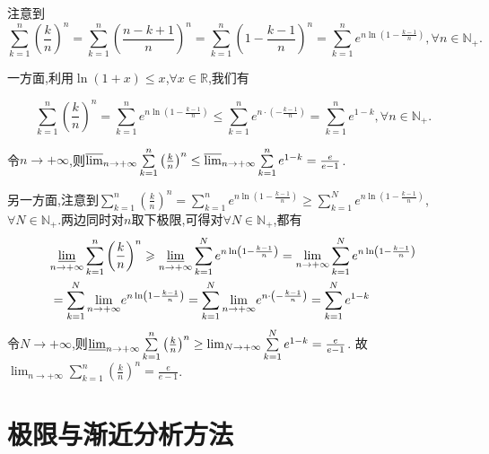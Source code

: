\documentclass[lang=cn,newtx,10pt,scheme=chinese]{elegantbook}
\begin{document}
\begin{solution}
   注意到
\[
\sum\limits_{k = 1}^{n}\left(\frac{k}{n}\right)^n = \sum\limits_{k = 1}^{n}\left(\frac{n - k + 1}{n}\right)^n = \sum\limits_{k = 1}^{n}\left(1 - \frac{k - 1}{n}\right)^n = \sum\limits_{k = 1}^{n}e^{n\ln\left(1 - \frac{k - 1}{n}\right)},  \forall n \in \mathbb{N}_+.
\]

一方面,利用\(\ln(1 + x) \leq x\),\(\forall x \in \mathbb{R}\),我们有

\[
\sum\limits_{k = 1}^{n}\left(\frac{k}{n}\right)^n = \sum\limits_{k = 1}^{n}e^{n\ln\left(1 - \frac{k - 1}{n}\right)} \leq \sum\limits_{k = 1}^{n}e^{n\cdot\left(-\frac{k - 1}{n}\right)} = \sum\limits_{k = 1}^{n}e^{1 - k},  \forall n \in \mathbb{N}_+.
\]

令\(n \to +\infty\),则\(\varlimsup_{n \to +\infty}\sum\limits_{k = 1}^{n}\left(\frac{k}{n}\right)^n \leq \varlimsup_{n \to +\infty}\sum\limits_{k = 1}^{n}e^{1 - k} = \frac{e}{e - 1}\).

另一方面,注意到\(\sum\limits_{k = 1}^{n}\left(\frac{k}{n}\right)^n = \sum\limits_{k = 1}^{n}e^{n\ln\left(1 - \frac{k - 1}{n}\right)} \geq \sum\limits_{k = 1}^{N}e^{n\ln\left(1 - \frac{k - 1}{n}\right)}\),\(\forall N \in \mathbb{N}_+\).两边同时对\(n\)取下极限,可得对\(\forall N \in \mathbb{N}_+\),都有
\begin{align*}
   &\underset{n\rightarrow +\infty}{{\varliminf }}\sum\limits_{k=1}^n{\left( \frac{k}{n} \right) ^n}\geqslant \underset{n\rightarrow +\infty}{{\varliminf }}\sum\limits_{k=1}^N{e^{n\ln \left( 1-\frac{k-1}{n} \right)}}=\underset{n\rightarrow +\infty}{\lim}\sum\limits_{k=1}^N{e^{n\ln \left( 1-\frac{k-1}{n} \right)}}
   \\
   &=\sum\limits_{k=1}^N{\underset{n\rightarrow +\infty}{\lim}e^{n\ln \left( 1-\frac{k-1}{n} \right)}}=\sum\limits_{k=1}^N{\underset{n\rightarrow +\infty}{\lim}e^{n\cdot \left( -\frac{k-1}{n} \right)}}=\sum\limits_{k=1}^N{e^{1-k}}
\end{align*}
令\(N \to +\infty\),则\(\varliminf_{n \to +\infty}\sum\limits_{k = 1}^{n}\left(\frac{k}{n}\right)^n \geq \lim_{N \to +\infty}\sum\limits_{k = 1}^{N}e^{1 - k} = \frac{e}{e - 1}\).
故\(\lim_{n \to +\infty}\sum\limits_{k = 1}^{n}\left(\frac{k}{n}\right)^n = \frac{e}{e - 1}\). 
\end{solution}



\chapter{极限与渐近分析方法}
\end{document}
